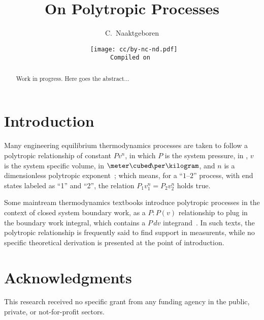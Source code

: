 \documentclass[10pt,a4paper]{article}
\title{On Polytropic Processes}
\author[1]{C.~Naaktgeboren}
\affil[1]{%
    Universidade Tecnológica Federal do Paraná -- UTFPR, Câmpus Guarapuava.\par
    Grupo de Pesquisa em Ciências Térmicas.
}
\date{{\scriptsize\tt%
    \texttt{[image: cc/by-nc-nd.pdf]}\\
    Compiled on 
}}
\begin{document}

\maketitle

\begin{abstract}
    Work in progress.
    Here goes the abstract...
\end{abstract}

\section{Introduction}

    Many engineering equilibrium thermodynamics processes  are  taken  to  follow  a  polytropic
    relationship of constant $Pv^n$, in which $P$ is the system pressure, in  \kilo\pascal,  $v$
    is the system specific volume, in $\meter\cubed\!\per\kilogram$, and $n$ is a  dimensionless
    polytropic  exponent~\cite{2013-CengelYA+BolesMA-AMGH};  which  means,  for  a  ``$1$--$2$''
    process, with end states labeled as ``1'' and ``2'',  the  relation  $P_1v_1^n  =  P_2v_2^n$
    holds true.

    Some maintream thermodynamics textbooks introduce polytropic processes  in  the  context  of
    closed system boundary work, as a  $P:P(v)$  relationship  to  plug  in  the  boundary  work
    integral,   which    contains    a    $P\,dv$    integrand~\cite{2013-CengelYA+BolesMA-AMGH,
    2002-MoranMJ+ShapiroHN-LTC, 1985-WylenG-Wiley}. In such texts, the  polytropic  relationship
    is frequently said to find support in measurents, while no specific  theoretical  derivation
    is presented at the point of introduction.

\section*{Acknowledgments}

    This research received no specific grant from any funding agency in the public, private,  or
    not-for-profit sectors.





\end{document}
